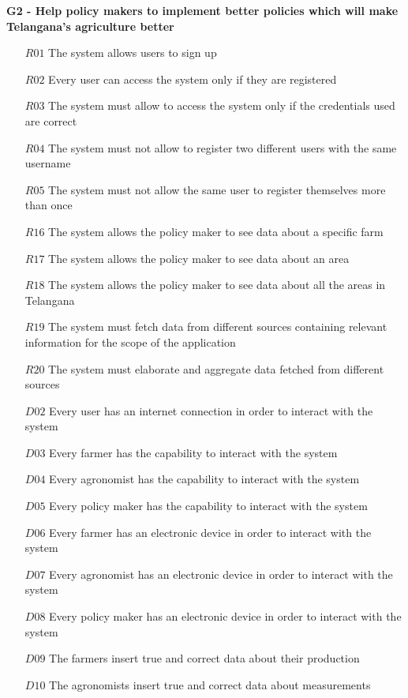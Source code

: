 \documentclass[10pt]{report}
\begin{document}
\textbf{G2 - Help policy makers to implement better policies which will make Telangana’s agriculture better}
\begin{itemize}
    \item [$R01$] The system allows users to sign up
    \item [$R02$] Every user can access the system only if they are registered
    \item [$R03$] The system must allow to access the system only if the credentials used are correct
    \item [$R04$] The system must not allow to register two different users with the same username
    \item [$R05$] The system must not allow the same user to register themselves more than once
    \item [$R16$] The system allows the policy maker to see data about a specific farm
    \item [$R17$] The system allows the policy maker to see data about an area
    \item [$R18$] The system allows the policy maker to see data about all the areas in Telangana
    \item [$R19$] The system must fetch data from different sources containing relevant information for the scope of the application
    \item [$R20$] The system must elaborate and aggregate data fetched from different sources
    \item [$D02$] Every user has an internet connection in order to interact with the system
    \item [$D03$] Every farmer has the capability to interact with the system
    \item [$D04$] Every agronomist has the capability to interact with the system
    \item [$D05$] Every policy maker has the capability to interact with the system
    \item [$D06$] Every farmer has an electronic device in order to interact with the system
    \item [$D07$] Every agronomist has an electronic device in order to interact with the system
    \item [$D08$] Every policy maker has an electronic device in order to interact with the system
    \item [$D09$] The farmers insert true and correct data about their production
    \item [$D10$] The agronomists insert true and correct data about measurements

\end{itemize}
\end{document}
